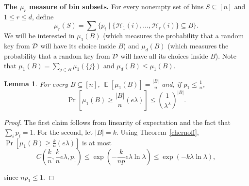 \documentclass[10pt,conference,letterpaper]{IEEEtran}
\newcommand{\spara}[1]{\smallskip\noindent\textbf{#1}}
\newcommand{\hash}[1]{\ensuremath{\mathcal{H}_{#1}}\xspace}
\newcommand{\mycomment}[1]{}
\DeclareMathOperator*{\expect}{\mathbb{E}}
\newtheorem{lemma}[theorem]{Lemma}
\newtheorem{corollary}[theorem]{Corollary}
\begin{document}
\spara{The $\mu_r$ measure of bin subsets.}
For every nonempty set of bins $S \subseteq[n]$ and $1 \le r \le d$, define
$$ \mu_r(S) = \sum\{ p_i \mid \{\hash{1}(i), \ldots, \hash{r}(i)\} \subseteq B \} .$$
We will be  interested in $\mu_1(B)$ (which measures the probability that a random key from ${\mathcal D}$ will have its choice inside $B$) and $\mu_d(B)$
(which measures the probability that a random key from ${\mathcal D}$ will have all its choices inside $B$).
Note that $\mu_1(B) = \sum_{j \in B} \mu_1(\{j\})$ and $\mu_d(B) \le \mu_1(B)$.

\begin{lemma}\label{lem:mu1}
For every $B \subseteq [n]$,
     $\expect [\mu_1(B)]= \frac{|B|}{n}$
and, if $p_1 \le \frac{1}{n}$,
       $$ \Pr \left[ \mu_1(B) \ge \frac{|B|}{n} (e \lambda) \right]  \le \left(\frac{1}{\lambda^\lambda}\right)^{|B|}. $$
\end{lemma}
\begin{proof}
The first claim follows from linearity of expectation and the fact that $\sum_i p_i = 1$.
For the second, let $|B| = k$. Using Theorem~\ref{chernoff},
$\Pr \left[ \mu_1(B) \ge \frac{k}{n} (e \lambda) \right]$ is at most
    $$
C\left(\frac{k}{n}, \frac{k}{n} e \lambda, p_1\right)
                                                   \le \exp\left(-\frac{k}{n p} e \lambda \ln \lambda \right) 
                                                   \le \exp(-k \lambda \ln \lambda),$$

since $n p_1 \le 1$.
\end{proof}

\mycomment{
    \begin{corollary}
    With high probability, for all $B \subseteq [n]$ it holds that
    $$ \mu_1(B) \le O\left(\frac{|B|}{n} \frac{\ln n}{\ln \ln n}\right). $$
    \end{corollary}
    \begin{proof}
    Since $\mu_1(B) = \sum_{j \in B} \mu_1(\{j\})$, it suffices to show the claim when $|B| = 1$.
    This follows from Lemma~\ref{lem:mu1} by setting $|B| = 1$, $\lambda = O(\frac{\ln n}{\ln \ln n})$, and applying the union bound.
    \end{proof}
}
\end{document}
